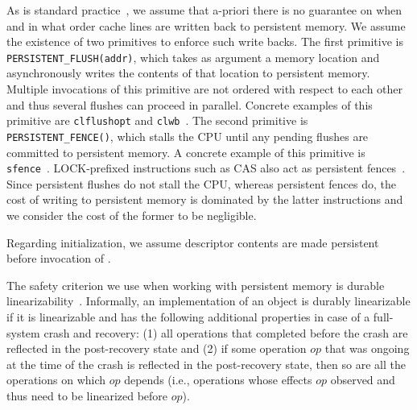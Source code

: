 As is standard practice~\cite{cohen18, david18, wang18}, we assume that a-priori there is no guarantee on when and 
in what order cache lines are written back to persistent memory. 
We assume the existence of two primitives to enforce such write backs. 
The first primitive is \texttt{PERSISTENT\_FLUSH(addr)}, which takes as argument 
a memory location and asynchronously writes the contents of that location to persistent memory. 
Multiple invocations of this primitive are not ordered with respect to each other and thus 
several flushes can proceed in parallel. 
Concrete examples of this primitive are \texttt{clflushopt} and \texttt{clwb}~\cite{intel}.
The second primitive is \texttt{PERSISTENT\_FENCE()}, which stalls the CPU until 
any pending flushes are committed to persistent memory.
A concrete example of this primitive is \texttt{sfence}~\cite{intel}. LOCK-prefixed instructions such as CAS also act as persistent fences~\cite{intel}.
Since persistent flushes do not stall the CPU, whereas persistent fences do, the cost of writing to persistent memory is dominated by the latter instructions and we consider the cost of the former to be negligible. 

Regarding initialization, we assume descriptor contents are made persistent before invocation of \mcas{}.

The safety criterion we use when working with persistent memory is durable linearizability~\cite{izraelevitz16}. 
Informally, an implementation of an object is durably linearizable if it is linearizable and has the following additional properties in case of a full-system crash and recovery: (1) all operations that completed before the crash are reflected in the post-recovery state and (2) if some operation $op$ that was ongoing at the time of the crash is reflected in the post-recovery state, then so are all the operations on which $op$ depends (i.e., operations whose effects $op$ observed and thus need to be linearized before $op$).
